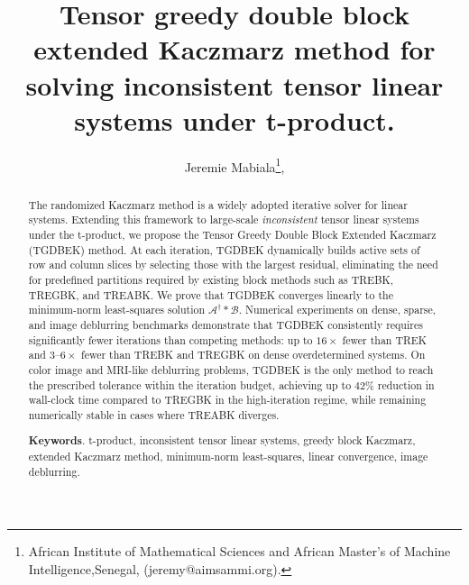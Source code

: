 \documentclass[11pt]{article}
\title{
Tensor greedy double block extended Kaczmarz method for solving inconsistent tensor linear systems under t-product.
}
\author{Jeremie Mabiala\thanks{African Institute of  Mathematical Sciences and African Master's of Machine Intelligence,Senegal, (jeremy@aimsammi.org).},%
}
\date{}
\def\fm#1{\mathcal{#1}}
\begin{document}
\maketitle

\begin{abstract} 

The randomized Kaczmarz method is a widely adopted iterative solver for linear systems. Extending this framework to large-scale \emph{inconsistent} tensor linear systems under the t-product, we propose the Tensor Greedy Double Block Extended Kaczmarz (TGDBEK) method. At each iteration, TGDBEK dynamically builds active sets of row and column slices by selecting those with the largest residual, eliminating the need for predefined partitions required by existing block methods such as TREBK, TREGBK, and TREABK. We prove that TGDBEK converges linearly to the minimum-norm least-squares solution $\fm{A}^\dagger * \fm{B}$. Numerical experiments on dense, sparse, and image deblurring benchmarks demonstrate that TGDBEK consistently requires significantly fewer iterations than competing methods: up to $16\times$ fewer than TREK and $3$--$6\times$ fewer than TREBK and TREGBK on dense overdetermined systems. On color image and MRI-like deblurring problems, TGDBEK is the only method to reach the prescribed tolerance within the iteration budget, achieving up to $42\%$ reduction in wall-clock time compared to TREGBK in the high-iteration regime, while remaining numerically stable in cases where TREABK diverges.

\vspace{.5mm} 

{\bf Keywords}. t-product, inconsistent tensor linear systems, greedy block Kaczmarz, extended Kaczmarz method, minimum-norm least-squares, linear convergence, image deblurring.


\end{abstract}
\end{document}
